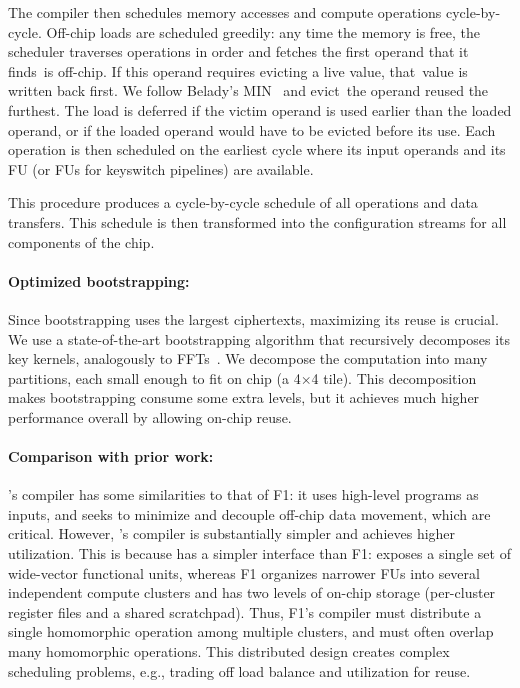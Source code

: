 The compiler then schedules memory accesses and compute operations
cycle-by-cycle. %
Off-chip loads are scheduled greedily: any time the memory is free, the scheduler
traverses operations in order and fetches the first operand that it finds~is off-chip.
If this operand requires evicting a live value, that~value is written back first.
We follow Belady's MIN~\cite{belady1966study} 
and evict~the operand reused the furthest.
The load is deferred if the victim operand is used earlier than the loaded operand,
or if the loaded operand would have to be evicted before its use.
Each operation is then scheduled on the earliest cycle where its 
input operands and its FU (or FUs for keyswitch pipelines) are available.

This procedure produces a cycle-by-cycle schedule of all operations and data transfers.
This schedule is then transformed into the configuration streams for 
all components of the chip.

\paragraph{Optimized bootstrapping:} Since bootstrapping uses the largest ciphertexts,
maximizing its reuse is crucial.
We use a state-of-the-art
bootstrapping algorithm that recursively decomposes
its key kernels, %
analogously to FFTs~\cite{chen:2019:improved}.
We decompose the computation into many partitions, each small
enough to fit on chip (a 4$\times$4 tile).
This decomposition makes bootstrapping consume some extra levels,
but it achieves much higher performance overall by allowing on-chip reuse.

\paragraph{Comparison with prior work:}
\name's compiler has some similarities to that of F1: it uses high-level programs as inputs,
and seeks to minimize and decouple off-chip data movement, which are critical.
However, \name's compiler is substantially simpler and achieves higher utilization.
This is because \name has a simpler interface than F1: \name exposes a single 
set of wide-vector functional units, whereas F1 organizes narrower FUs into several independent compute clusters
and has two levels of on-chip storage (per-cluster register files and a shared scratchpad).
Thus, F1's compiler must distribute a single homomorphic operation among multiple clusters,
and must often overlap many homomorphic operations.
This distributed design creates complex scheduling problems, 
e.g., trading off load balance and utilization for reuse.

